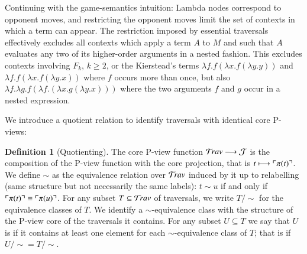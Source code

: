 \documentclass{elsarticle}
\makeatletter
\newif\iflongversion
\theoremstyle{plain}
\newtheorem{property}[theorem]{Property}
\theoremstyle{definition}
\newtheorem{definition}{Definition}[section]
\newcommand\Nodes{\mathcal{N}}%
\newcommand\NodesLmd{\Nodes_\lambda}%
\newcommand{\travulc}{\travset}
\def\coresymbol{\pi} %
\newcommand{\core}[1]{\coresymbol(#1)} %
\newcommand{\ExternalNodes}{\Nodes^{\sf ext}}
\renewcommand\ie{{\it i.e.\@\xspace}}
\def\justseqset{\mathcal{J}}
\makeatother
\begin{document}
Continuing with the game-semantics intuition: Lambda nodes correspond to opponent moves, and restricting the opponent moves limit the set of contexts in which a term can appear. The restriction imposed by essential traversals effectively excludes all contexts which apply a term $A$ to $M$ and such that $A$ evaluates any two of its higher-order arguments in a nested fashion. This excludes contexts involving $F_k$, $k\geq 2$, or the Kierstead's terms $\lambda f .f (\lambda x .f (\lambda y.y))$ and $\lambda f .f (\lambda x .f (\lambda y.x))$ where $f$ occurs more than once, but also $\lambda f. \lambda g . f (\lambda f .(\lambda x . g (\lambda y . x)))$ where the two arguments $f$ and $g$ occur in a nested expression.

\iflongversion
\begin{property}
\label{prop:core_truncation_at_externallambda}
Let $t\in\travulc$ be a traversal which does not contain any ghost occurrence, and $m$ be an occurrence in $t$ of an external $\lambda$-node (\ie, $m \in \NodesLmd\inter\ExternalNodes$). Then $\core{t_{<m}} = \core{t}_{<m}$.
\end{property}
\begin{proof}
By an easy induction on $t$ using the fact that in the recursive calculation of $\coresymbol(t)$, external lambda nodes reset the stack of pending lambdas.
\end{proof}
\fi

We introduce a quotient relation to identify traversals with identical core P-views:
\begin{definition}[Quotienting]
The core P-view function
$\travulc \longrightarrow \justseqset $
is the composition of
the P-view function
 with the core projection,
 that is $t \longmapsto \pview{\core{t}}$.
We define $\sim$ as the equivalence relation over $\travulc$ induced by it up to relabelling (same structure but not necessarily the same labels): $t \sim u$ if and only if $\pview{\core{t}} \equiv \pview{\core{u}}$.
For any subset $T\subseteq \travulc$ of traversals, we write $T/{\sim}$ for the equivalence classes of $T$. We identify a $\sim$-equivalence class with the structure of the P-view core of the traversals it contains.
For any subset $U\subseteq T$ we say that $U$ is  if it contains at least one element for each $\sim$-equivalence class of $T$; that is if $U/{\sim} = T/{\sim}$.
\end{definition}
\end{document}
